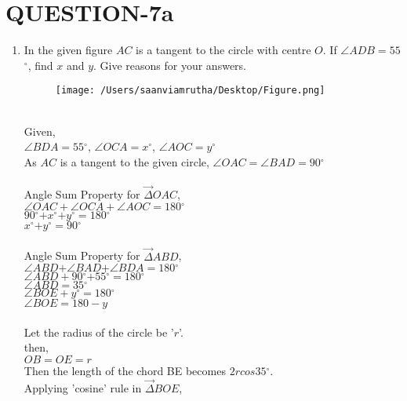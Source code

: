 \documentclass[journal,12pt,twocolumn]{IEEEtran}
\renewcommand\thesection{\arabic{section}}
\begin{document}
\section{\textbf{QUESTION-7a}}
\begin{enumerate}[label=\thesection.\arabic*.,ref=\thesection.\theenumi]

\item In the given figure $AC$ is a tangent to the circle with centre $O$. If $\angle$$ADB=55$$^{\circ}$, find $x$ and $y$. Give reasons for your answers.\\
\begin{figure}[htbp]
\texttt{[image: /Users/saanviamrutha/Desktop/Figure.png]}
\label{fig}
\end{figure}

\solution \\
Given,\\
 $\angle$$BDA=55$$^{\circ}$, $\angle$$OCA=x$$^{\circ}$, $\angle$$AOC=y$$^{\circ}$\\

As $AC$ is a tangent to the given circle, $\angle$$OAC=$$\angle$$BAD=90$$^{\circ}$\\
\\
Angle Sum Property for $\vec{\Delta}$$OAC$, \\
              $\angle$$OAC+$$\angle$$OCA+$$\angle$$AOC=$$180$$^{\circ}$ \\
               $90$$^{\circ}$$+x$$^{\circ}$$+y$$^{\circ}$$=180$$^{\circ}$\\
               $x$$^{\circ}$$+y$$^{\circ}$$=90$$^{\circ}$\\ \\
               
Angle Sum Property for $\vec{\Delta}$$ABD$, \\   
               $\angle$$ABD$$+$$\angle$$BAD$$+$$\angle$$BDA$$=$$180$$^{\circ}$\\
               $\angle$$ABD+90$$^{\circ}$$+55$$^{\circ}$$=180$$^{\circ}$\\
               $\angle$$ABD=35$$^{\circ}$\\ 
                
                $\angle$$BOE+y$$^{\circ}$$=180$$^{\circ}$\\
                $\angle$$BOE=180-y$\\ \\
                Let the radius of the circle be '$r$'.\\
                then,\\
                $OB=OE=r$\\
                Then the length of the chord BE becomes $2rcos 35$$^{\circ}$.\\
                Applying 'cosine' rule in $\vec{\Delta}$$BOE$,\\ 
              

\end{enumerate}
\end{document}
